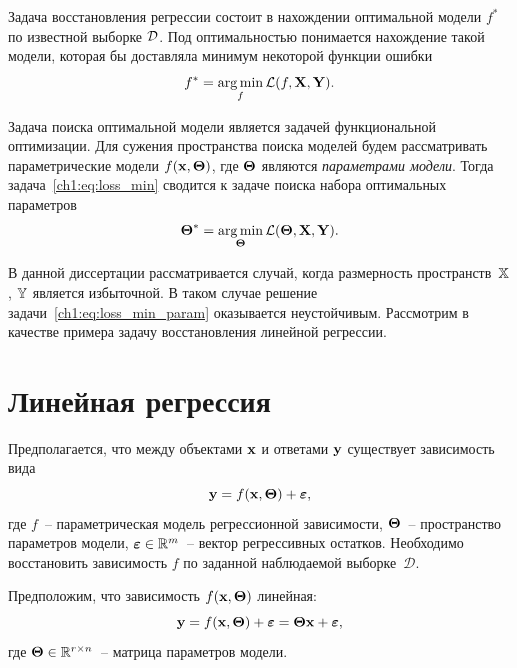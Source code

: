 Задача восстановления регрессии состоит в нахождении оптимальной модели $f^*$ по известной выборке $\mathcal{D}$. Под оптимальностью понимается нахождение такой модели, которая бы доставляла минимум некоторой функции ошибки
\begin{equation}
	f^* = \mathop{\arg \min}\limits_f \mathcal{L}(f, \mathbf{X}, \mathbf{Y}).
	\label{ch1:eq:loss_min}
\end{equation}

Задача поиска оптимальной модели является задачей функциональной оптимизации. 
Для сужения пространства поиска моделей будем рассматривать параметрические модели $f(\mathbf{x}, \boldsymbol{\Theta})$, где $\boldsymbol{\Theta}$ являются \textit{параметрами модели}. 
Тогда задача~\eqref{ch1:eq:loss_min} сводится к задаче поиска набора оптимальных параметров
\begin{equation}
\boldsymbol{\Theta}^* = \mathop{\arg \min}\limits_{\boldsymbol{\Theta}} \mathcal{L}(\boldsymbol{\Theta}, \mathbf{X}, \mathbf{Y}).
\label{ch1:eq:loss_min_param}
\end{equation}

В данной диссертации рассматривается случай, когда размерность пространств~$\mathbb{X}$, $\mathbb{Y}$ является избыточной. 
В таком случае решение задачи~\eqref{ch1:eq:loss_min_param} оказывается неустойчивым. 
Рассмотрим в качестве примера задачу восстановления линейной регрессии.

\section{Линейная регрессия}
\label{ch1:sec_lin_reg}

Предполагается, что между объектами $\mathbf{x}$ и ответами $\mathbf{y}$ существует зависимость вида
\begin{equation}
	\mathbf{y} = f(\mathbf{x}, \boldsymbol{\Theta}) + \boldsymbol{\varepsilon},
	\label{ch1:eq:reg_model}
\end{equation}
где $f$~-- параметрическая модель регрессионной зависимости, $\boldsymbol{\Theta}$~-- пространство параметров модели, $\boldsymbol{\varepsilon} \in \mathbb{R}^{m}$~-- вектор регрессивных остатков. 
Необходимо восстановить зависимость $f$ по заданной наблюдаемой выборке~$\mathcal{D}$.

Предположим, что зависимость $f(\mathbf{x}, \boldsymbol{\Theta})$ линейная:
\begin{equation}
	\mathbf{y} = f(\mathbf{x}, \boldsymbol{\Theta}) + \boldsymbol{\varepsilon} = \boldsymbol{\Theta} \mathbf{x}+ \boldsymbol{\varepsilon},
	\label{ch1:eq:lin_reg_model}
\end{equation}
\noindent где $\boldsymbol{\Theta} \in \mathbb{R}^{r \times n}$~-- матрица параметров модели.

